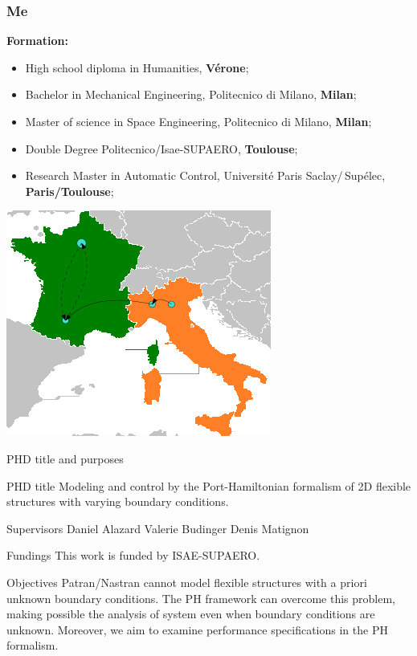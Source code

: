 \documentclass{beamer}
\begin{document}
\begin{frame}{}
\frametitle{Me}

\textbf{Formation:}
\begin{itemize}
	\item High school diploma in Humanities, \textbf{Vérone};
	\item Bachelor in Mechanical Engineering, Politecnico di Milano, \textbf{Milan};
	\item Master of science in Space Engineering, Politecnico di Milano, \textbf{Milan};
	\item Double Degree Politecnico/Isae-SUPAERO, \textbf{Toulouse};
	\item Research Master in Automatic Control, Université Paris Saclay/\,Supélec, \textbf{Paris/Toulouse};
\end{itemize}
\centering
\includegraphics[height=0.4\textheight]{trip.png}

\end{frame}

\begin{frame}{PHD title and purposes}

\begin{block}{PHD title}
Modeling and control by the Port-Hamiltonian formalism of 2D flexible structures with varying boundary conditions.
\end{block}
\begin{block}{Supervisors}
Daniel Alazard \hspace{1.5cm} Valerie Budinger 
\hspace{1.5cm}
Denis Matignon
\end{block}
\begin{block}{Fundings}
This work is funded by ISAE-SUPAERO.
\end{block} 

\begin{block}{Objectives}
Patran/Nastran cannot model  flexible structures with a priori unknown boundary conditions. The PH framework can overcome this problem, making possible the analysis of system even when boundary conditions are unknown. Moreover, we aim to examine performance specifications in the PH formalism.
\end{block}

\end{frame}
\end{document}
